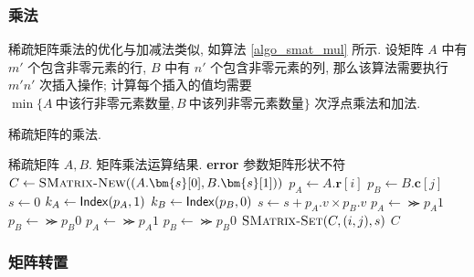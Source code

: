 \subsubsection{乘法}

稀疏矩阵乘法的优化与加减法类似, 如算法 \ref{algo_smat_mul} 所示. 设矩阵 $A$ 中有 $m'$ 个包含非零元素的行, $B$ 中有 $n'$ 个包含非零元素的列, 那么该算法需要执行 $m' n'$ 次插入操作; 计算每个插入的值均需要 $\min\{A\ \text{中该行非零元素数量}, B\ \text{中该列非零元素数量}\}$ 次浮点乘法和加法.
\begin{breakablealgorithm}
\caption{稀疏矩阵的乘法.}
\label{algo_smat_mul}
\begin{algorithmic}[1]
\Require 稀疏矩阵 $A, B.$
\Ensure 矩阵乘法运算结果.
        \State \textbf{error} 参数矩阵形状不符
    \EndIf
    \State $C \gets \textsc{SMatrix-New}((A.\bm{s}[0], B.\bm{s}[1]))$
            \State $p_A \gets A.\bm{r}[i]$
            \State $p_B \gets B.\bm{c}[j]$
            \State $s \gets 0$
                    \State $k_A \gets \mathsf{Index}(p_A, 1)$
                    \State $k_B \gets \mathsf{Index}(p_B, 0)$
                        \State $s \gets s + p_A.v \times p_B.v$
                    \EndIf
                    \If{}
                    \EndIf
                        \State $p_A \gets \Succ{p_A}{1}$
                    \EndIf
                        \State $p_B \gets \Succ{p_B}{0}$
                    \EndIf
                    \State $p_A \gets \Succ{p_A}{1}$
                \Else
                    \State $p_B \gets \Succ{p_B}{0}$
                \EndIf
            \EndWhile
            \State $\textsc{SMatrix-Set}(C, (i, j), s)$
        \EndFor
    \EndFor
    \State \Return $C$
\EndFunction
\end{algorithmic}
\end{breakablealgorithm}

\subsubsection{矩阵转置}


